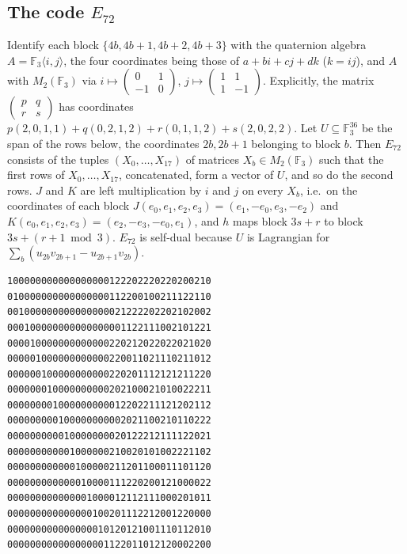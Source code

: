 \documentclass[11pt]{amsart}
\theoremstyle{definition}
\newcommand{\F}{\mathbb{F}_3}
\begin{document}
\subsection{The code \texorpdfstring{$E_{72}$}{E72}}\label{app:e72}
Identify each block $\{4b,4b+1,4b+2,4b+3\}$ with the quaternion algebra $A=\F\langle i,j\rangle$, the
four coordinates being those of $a+bi+cj+dk$ ($k=ij$), and $A$ with $M_2(\F)$ via
$i\mapsto\left(\begin{smallmatrix}0&1\\-1&0\end{smallmatrix}\right)$,
$j\mapsto\left(\begin{smallmatrix}1&1\\1&-1\end{smallmatrix}\right)$. Explicitly, the matrix
$\left(\begin{smallmatrix}p&q\\r&s\end{smallmatrix}\right)$ has coordinates
$p(2,0,1,1)+q(0,2,1,2)+r(0,1,1,2)+s(2,0,2,2)$. Let $U\subseteq\F^{36}$ be the span of the rows below,
the coordinates $2b,2b+1$ belonging to block $b$. Then $E_{72}$ consists of the tuples
$(X_0,\dots,X_{17})$ of matrices $X_b\in M_2(\F)$ such that the first rows of $X_0,\dots,X_{17}$,
concatenated, form a vector of $U$, and so do the second rows.
$J$ and $K$ are left multiplication by $i$ and $j$ on every $X_b$, i.e.\ on the coordinates of each
block $J(e_0,e_1,e_2,e_3)=(e_1,-e_0,e_3,-e_2)$ and $K(e_0,e_1,e_2,e_3)=(e_2,-e_3,-e_0,e_1)$, and $h$
maps block $3s+r$ to block $3s+(r+1\bmod3)$. $E_{72}$ is self-dual because $U$ is Lagrangian for
$\sum_b(u_{2b}v_{2b+1}-u_{2b+1}v_{2b})$.
{\footnotesize
\begin{verbatim}
100000000000000000122202220220200210
010000000000000000112200100211122110
001000000000000000021222202202102002
000100000000000000001122111002101221
000010000000000000220212022022021020
000001000000000000220011021110211012
000000100000000000220201112121211220
000000010000000000202100021010022211
000000001000000000012202211121202112
000000000100000000002021100210110222
000000000010000000020122212111122021
000000000001000000210020101002221102
000000000000100000211201100011101120
000000000000010000111220200121000022
000000000000001000012112111000201011
000000000000000100201112212001220000
000000000000000010120121001110112010
000000000000000001122011012120002200
\end{verbatim}
}
\end{document}
